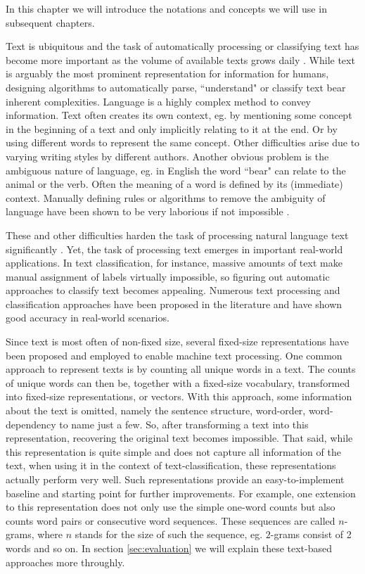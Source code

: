 In this chapter we will introduce the notations and concepts we will use in subsequent chapters.


Text is ubiquitous and the task of automatically processing or classifying text has become more important as the volume of available texts grows daily \cite{Joachims1998}.
While text is arguably the most prominent representation for information for humans, designing algorithms to automatically parse, ``understand" or classify text bear inherent complexities.
Language is a highly complex method to convey information. 
Text often creates its own context, eg. by mentioning some concept in the beginning of a text and only implicitly relating to it at the end. Or by using different words to represent the same concept.
Other difficulties arise due to varying writing styles by different authors.
Another obvious problem is the ambiguous nature of language\cite{Britton1978}, eg. in English the word ``bear" can relate to the animal or the verb.
Often the meaning of a word is defined by its (immediate) context.
Manually defining rules or algorithms to remove the ambiguity of language have been shown to be very laborious if not impossible \cite[p.~11]{Weikum2002}.

These and other difficulties harden the task of processing natural language text significantly \cite{Chowdhury2003,Weikum2002}.
Yet, the task of processing text emerges in important real-world applications.
In text classification, for instance, massive amounts of text make manual assignment of labels virtually impossible, so figuring out automatic approaches to classify text becomes appealing.
Numerous text processing and classification approaches have been proposed in the literature and have shown good accuracy in real-world scenarios.

Since text is most often of non-fixed size, several fixed-size representations have been proposed and employed to enable machine text processing.
One common approach to represent texts is by counting all unique words in a text. The counts of unique words can then be, together with a fixed-size vocabulary, transformed into fixed-size representations, or vectors.
With this approach, some information about the text is omitted, namely the sentence structure, word-order, word-dependency to name just a few. 
So, after transforming a text into this representation, recovering the original text becomes impossible.
That said, while this representation is quite simple and does not capture all information of the text, when using it in the context of text-classification, these representations actually perform very well.
Such representations provide an easy-to-implement baseline and starting point for further improvements.
For example, one extension to this representation does not only use the simple one-word counts but also counts word pairs or consecutive word sequences. These sequences are called $n$-grams, where $n$ stands for the size of such the sequence, eg. $2$-grams consist of 2 words and so on.
In section \ref{sec:evaluation} we will explain these text-based approaches more throughly.

